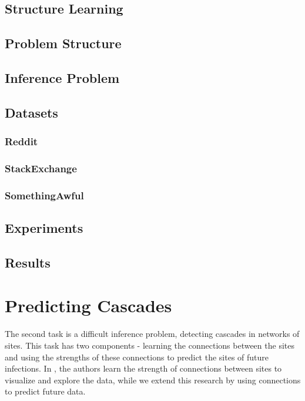 \documentclass{article} %
\begin{document}
\subsection{Structure Learning}
\subsection{Problem Structure}

\subsection{Inference Problem}

\subsection{Datasets}

\subsubsection{Reddit}
\subsubsection{StackExchange}
\subsubsection{SomethingAwful}

\subsection{Experiments}
\label{experiments}

\subsection{Results}
\label{results}

\section{Predicting Cascades}

The second task is a difficult inference problem, detecting cascades in networks of sites. This task has two components - learning the connections between the sites and using the strengths of these connections to predict the sites of future infections. In \cite{netinf}, the authors learn the strength of connections between sites to visualize and explore the data, while we extend this research by using connections to predict future data.
\end{document}
